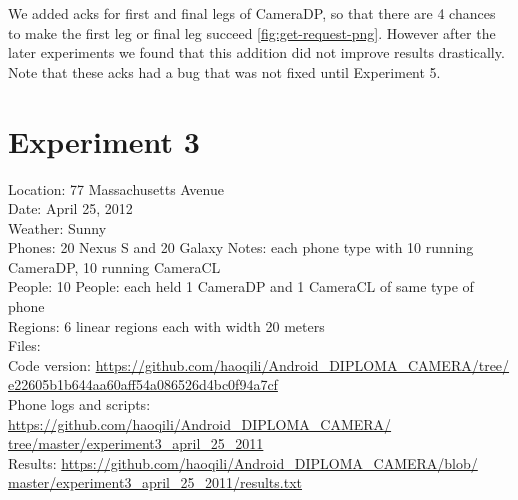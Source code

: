 We added acks for first and final legs of CameraDP, so that there are 4 chances to make the first leg or final leg succeed \ref{fig:get-request-png}. However after the later experiments we found that this addition did not improve results drastically. Note that these acks had a bug that was not fixed until Experiment 5.

\section{Experiment 3}

Location: 77 Massachusetts Avenue\\
Date: April 25, 2012\\
Weather: Sunny\\
Phones: 20 Nexus S and 20 Galaxy Notes: each phone type with 10 running CameraDP, 10 running CameraCL\\
People: 10 People: each held 1 CameraDP and 1 CameraCL of same type of phone\\
Regions: 6 linear regions each with width 20 meters\\
Files:\\
Code version: {\url{https://github.com/haoqili/Android_DIPLOMA_CAMERA/tree/}}\\
{\url{e22605b1b644aa60aff54a086526d4bc0f94a7cf}}\\
Phone logs and scripts: {\url{https://github.com/haoqili/Android_DIPLOMA_CAMERA/}}\\
{\url{tree/master/experiment3_april_25_2011}}\\ 
Results: {\url{https://github.com/haoqili/Android_DIPLOMA_CAMERA/blob/}}\\
{\url{master/experiment3_april_25_2011/results.txt}}\\

